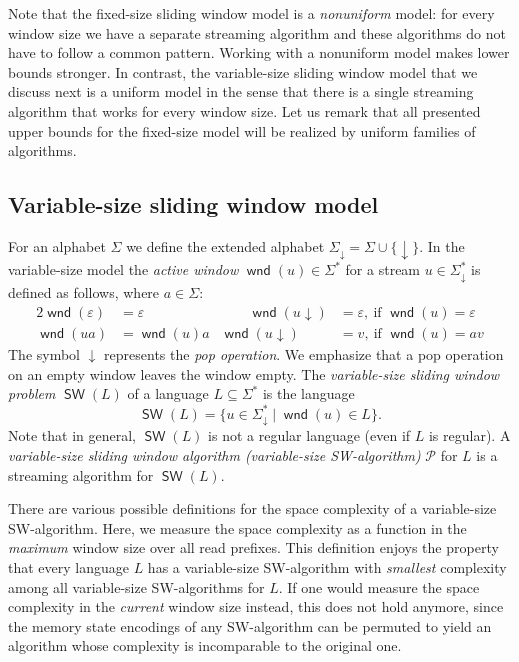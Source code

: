 \documentclass{theoretics}
\renewcommand{\P}{\mathcal{P}}
\DeclareMathOperator{\wnd}{\mathsf{wnd}}
\DeclareMathOperator{\SW}{\mathsf{SW}}
\begin{document}
Note that the fixed-size sliding window model is a {\em nonuniform} model: for every window size we have
a separate streaming algorithm and these algorithms do not have to follow a common pattern. 
Working with a nonuniform model makes lower bounds stronger.
In contrast, the variable-size sliding window model that we discuss next is a uniform model in the 
sense that there is a single streaming algorithm that works for every window size.
Let us remark that all presented upper bounds for the fixed-size model will be realized by uniform families of algorithms.


\subsection{Variable-size sliding window model} \label{sec-variable-size}

For an alphabet $\Sigma$ we define the extended alphabet $\Sigma_\downarrow = \Sigma \cup \{\downarrow\}$.
In the variable-size model the {\em active window} $\wnd(u) \in \Sigma^*$ for a stream $u \in \Sigma_\downarrow^*$ is defined as follows, where $a \in \Sigma$:
\begin{alignat*}{2}
\wnd(\varepsilon) & = \varepsilon  & \qquad     \wnd(u \! \downarrow) & = \varepsilon, ~ \text{if } \wnd(u) = \varepsilon \\
\wnd(ua) & = \wnd(u) a         &   \wnd(u \! \downarrow) & = v, ~ \text{if } \wnd(u) = av
\end{alignat*}
The symbol $\downarrow$ represents the {\em pop operation}.
We emphasize that a pop operation on an empty window leaves the window empty.
The {\em variable-size sliding window problem} $\SW(L)$ of
a language $L \subseteq \Sigma^*$ is the language
\begin{equation}
\label{def-SW(L)}
\SW(L) = \{ u \in \Sigma_\downarrow^* \mid \wnd(u) \in L \}.
\end{equation}
Note that in general, $\SW(L)$ is not a regular language (even if $L$ is regular).
A {\em variable-size sliding window algorithm (variable-size SW-algorithm)} $\P$ for $L$
is a streaming algorithm for $\SW(L)$.

There are various possible definitions for the space complexity of a variable-size SW-algorithm.
Here, we measure the space complexity as a function in the \emph{maximum} window size over all read prefixes.
This definition enjoys the property that every language $L$ has a variable-size SW-algorithm with \emph{smallest} complexity
among all variable-size SW-algorithms for $L$.
If one would measure the space complexity in the \emph{current} window size instead,
this does not hold anymore, since the memory state encodings of any SW-algorithm can be permuted
to yield an algorithm whose complexity is incomparable to the original one.
\end{document}
